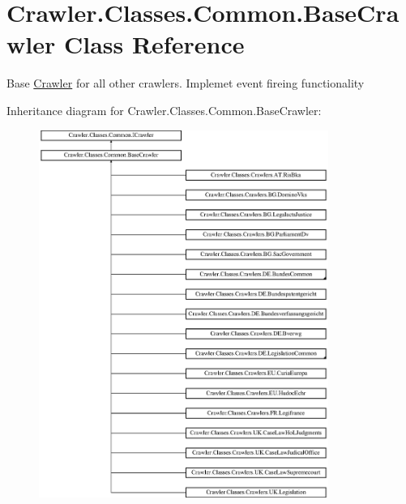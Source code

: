 \hypertarget{class_crawler_1_1_classes_1_1_common_1_1_base_crawler}{\section{Crawler.\-Classes.\-Common.\-Base\-Crawler Class Reference}
\label{class_crawler_1_1_classes_1_1_common_1_1_base_crawler}
}


Base \hyperlink{namespace_crawler}{Crawler} for all other crawlers. Implemet event fireing functionality  


Inheritance diagram for Crawler.\-Classes.\-Common.\-Base\-Crawler\-:\begin{figure}[H]
\begin{center}
\leavevmode
\includegraphics[height=12.000000cm]{class_crawler_1_1_classes_1_1_common_1_1_base_crawler}
\end{center}
\end{figure}

